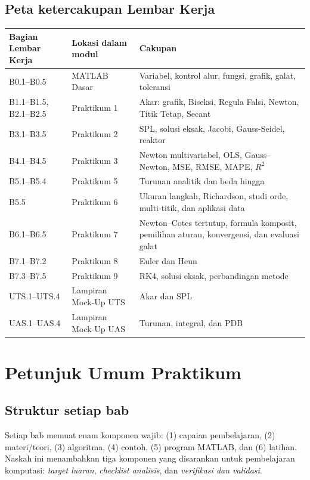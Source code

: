 \documentclass[book,english,noindex,lean,nobackpage,nocopyright,noupdate,nofiglist,notablist]{enacom}
\begin{document}
\section*{Peta ketercakupan Lembar Kerja}
\renewcommand{\arraystretch}{1.18}
\begin{tabularx}{\textwidth}{p{}p{}X}
\hline
\textbf{Bagian Lembar Kerja} & \textbf{Lokasi dalam modul} & \textbf{Cakupan}\\\hline
B0.1--B0.5 & MATLAB Dasar & Variabel, kontrol alur, fungsi, grafik, galat, toleransi\\
B1.1--B1.5, B2.1--B2.5 & Praktikum 1 & Akar: grafik, Biseksi, Regula Falsi, Newton, Titik Tetap, Secant\\
B3.1--B3.5 & Praktikum 2 & SPL, solusi eksak, Jacobi, Gauss-Seidel, reaktor\\
B4.1--B4.5 & Praktikum 3 & Newton multivariabel, OLS, Gauss--Newton, MSE, RMSE, MAPE, $R^2$\\
B5.1--B5.4 & Praktikum 5 & Turunan analitik dan beda hingga\\
B5.5 & Praktikum 6 & Ukuran langkah, Richardson, studi orde, multi-titik, dan aplikasi data\\
B6.1--B6.5 & Praktikum 7 & Newton--Cotes tertutup, formula komposit, pemilihan aturan, konvergensi, dan evaluasi galat\\
B7.1--B7.2 & Praktikum 8 & Euler dan Heun\\
B7.3--B7.5 & Praktikum 9 & RK4, solusi eksak, perbandingan metode\\
UTS.1--UTS.4 & Lampiran Mock-Up UTS & Akar dan SPL\\
UAS.1--UAS.4 & Lampiran Mock-Up UAS & Turunan, integral, dan PDB\\\hline
\end{tabularx}

\chapter*{Petunjuk Umum Praktikum}
\section*{Struktur setiap bab}
Setiap bab memuat enam komponen wajib: (1) capaian pembelajaran, (2) materi/teori, (3) algoritma, (4) contoh, (5) program MATLAB, dan (6) latihan. Naskah ini menambahkan tiga komponen yang disarankan untuk pembelajaran komputasi: \textit{target luaran}, \textit{checklist analisis}, dan \textit{verifikasi dan validasi}.
\end{document}

